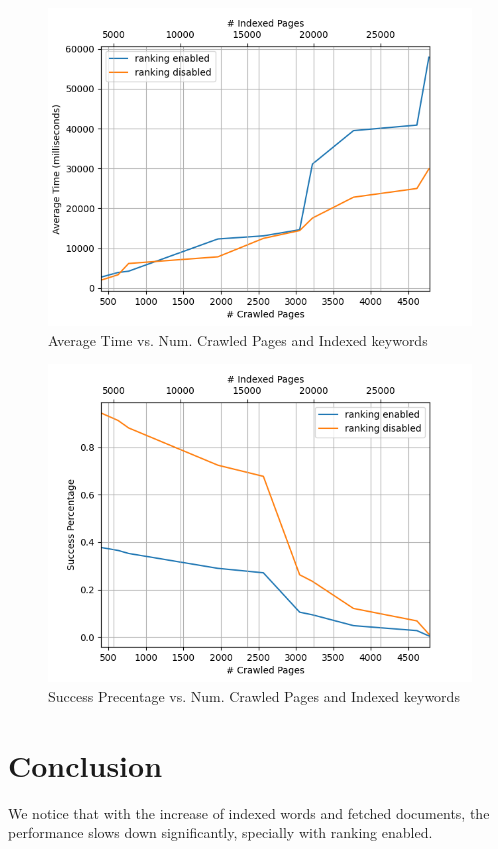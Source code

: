 \documentclass[12pt]{article}
\begin{document}
\begin{figure}
  \centering
  \includegraphics[width=15cm]{avgtime.png}
  \caption{Average Time vs. Num. Crawled Pages and Indexed keywords}
  \label{fig:avgtime}
\end{figure}

\begin{figure}
  \centering
  \includegraphics[width=15cm]{secPrec.png}
  \caption{Success Precentage vs. Num. Crawled Pages and Indexed keywords}
  \label{fig:secPrec}
\end{figure}

\clearpage

\section{Conclusion}
We notice that with the increase of indexed words and fetched documents, the performance slows down significantly, specially with ranking enabled.
\end{document}

